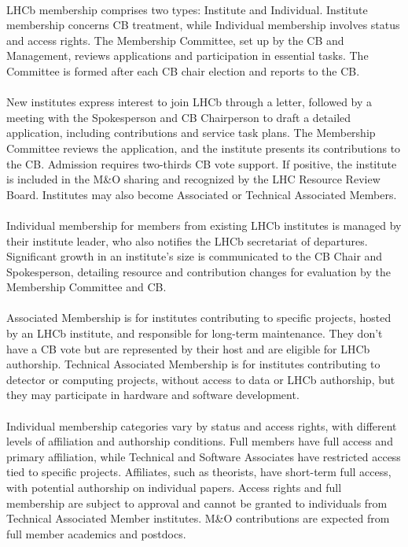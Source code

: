 \paragraph{}LHCb membership comprises two types: Institute and Individual. Institute membership concerns CB treatment, while Individual membership involves status and access rights. The Membership Committee, set up by the CB and Management, reviews applications and participation in essential tasks. The Committee is formed after each CB chair election and reports to the CB.

\paragraph{} New institutes express interest to join LHCb through a letter, followed by a meeting with the Spokesperson and CB Chairperson to draft a detailed application, including contributions and service task plans. The Membership Committee reviews the application, and the institute presents its contributions to the CB. Admission requires two-thirds CB vote support. If positive, the institute is included in the M\&O sharing and recognized by the LHC Resource Review Board. Institutes may also become Associated or Technical Associated Members.\paragraph{} Individual membership for members from existing LHCb institutes is managed by their institute leader, who also notifies the LHCb secretariat of departures.  Significant growth in an institute's size is communicated to the CB Chair and Spokesperson, detailing resource and contribution changes for evaluation by the Membership Committee and CB.

\paragraph{} Associated Membership is for institutes contributing to specific projects, hosted by an LHCb institute, and responsible for long-term maintenance. They don't have a CB vote but are represented by their host and are eligible for LHCb authorship.  Technical Associated Membership is for institutes contributing to detector or computing projects, without access to data or LHCb authorship, but they may participate in hardware and software development.

\paragraph{} Individual membership categories vary by status and access rights, with different levels of affiliation and authorship conditions. Full members have full access and primary affiliation, while Technical and Software Associates have restricted access tied to specific projects. Affiliates, such as theorists, have short-term full access, with potential authorship on individual papers. Access rights and full membership are subject to approval and cannot be granted to individuals from Technical Associated Member institutes. M\&O contributions are expected from full member academics and postdocs.

